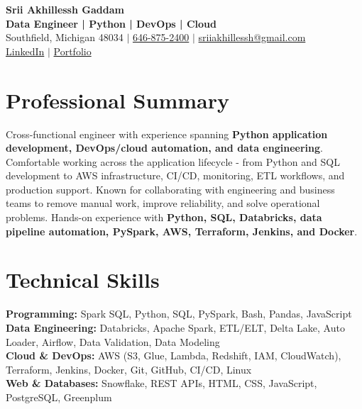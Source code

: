 \documentclass[letterpaper,10pt]{article}
\begin{document}
\fontsize{9.35pt}{10.45pt}\selectfont

\begin{center}
    {\LARGE \textbf{Srii Akhillessh Gaddam}} \\[-1pt]
    \textbf{Data Engineer | Python | DevOps | Cloud} \\[2pt]
    Southfield, Michigan 48034 $|$
    \href{tel:6468752400}{646-875-2400} $|$
    \href{mailto:sriiakhillessh@gmail.com}{sriiakhillessh@gmail.com} \\[1pt]
    \href{https://www.linkedin.com/in/srii-akhiilessh-gaddam-b48668191/}{LinkedIn} $|$
    \href{https://sriiakhillesshg.github.io/portfolio/}{Portfolio}
\end{center}
\vspace{-8pt}

\section{Professional Summary}
\small{Cross-functional engineer with experience spanning \textbf{Python application development, DevOps/cloud automation, and data engineering}. Comfortable working across the application lifecycle - from Python and SQL development to AWS infrastructure, CI/CD, monitoring, ETL workflows, and production support. Known for collaborating with engineering and business teams to remove manual work, improve reliability, and solve operational problems. Hands-on experience with \textbf{Python, SQL, Databricks, data pipeline automation, PySpark, AWS, Terraform, Jenkins, and Docker}.}

\section{Technical Skills}
\small{
\textbf{Programming:} Spark SQL, Python, SQL, PySpark, Bash, Pandas, JavaScript \\
\textbf{Data Engineering:} Databricks, Apache Spark, ETL/ELT, Delta Lake, Auto Loader, Airflow, Data Validation, Data Modeling \\
\textbf{Cloud \& DevOps:} AWS (S3, Glue, Lambda, Redshift, IAM, CloudWatch), Terraform, Jenkins, Docker, Git, GitHub, CI/CD, Linux \\
\textbf{Web \& Databases:} Snowflake, REST APIs, HTML, CSS, JavaScript, PostgreSQL, Greenplum
}

\end{document}
